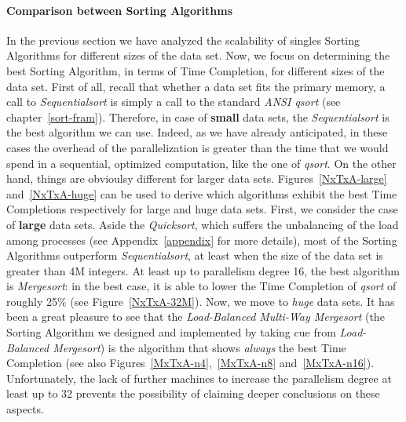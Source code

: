 \paragraph{Comparison between Sorting Algorithms}
In the previous section we have analyzed the scalability of singles Sorting Algorithms for different sizes of the data set. Now, we focus on determining the best Sorting Algorithm, in terms of Time Completion, for different sizes of the data set. First of all, recall that whether a data set fits the primary memory, a call to \textit{Sequentialsort} is simply a call to the standard \textit{ANSI qsort} (see chapter~\ref{sort-fram}). Therefore, in case of \textbf{small} data sets, the \textit{Sequentialsort} is the best algorithm we can use. Indeed, as we have already anticipated, in these cases the overhead of the parallelization is greater than the time that we would spend in a sequential, optimized computation, like the one of \textit{qsort}. On the other hand, things are obvioulsy different for larger data sets. Figures~\ref{NxTxA-large} and~\ref{NxTxA-huge} can be used to derive which algorithms exhibit the best Time Completions respectively for large and huge data sets. First, we consider the case of \textbf{large} data sets. 
Aside the \textit{Quicksort}, which suffers the unbalancing of the load among processes (see Appendix~\ref{appendix} for more details), most of the Sorting Algorithms outperform \textit{Sequentialsort}, at least when the size of the data set is greater than 4M integers. At least up to parallelism degree 16, the best algorithm is \textit{Mergesort}: in the best case, it is able to lower the Time Completion of \textit{qsort} of roughly 25$\%$ (see Figure~\ref{NxTxA-32M}). Now, we move to \textit{huge} data sets. It has been a great pleasure to see that the \textit{Load-Balanced Multi-Way Mergesort} (the Sorting Algorithm we designed and implemented by taking cue from \textit{Load-Balanced Mergesort}) is the algorithm that shows \textit{always} the best Time Completion (see also Figures~\ref{MxTxA-n4},~\ref{MxTxA-n8} and~\ref{MxTxA-n16}). Unfortunately, the lack of further machines to increase the parallelism degree at least up to 32 prevents the possibility of claiming deeper conclusions on these aspects. 


